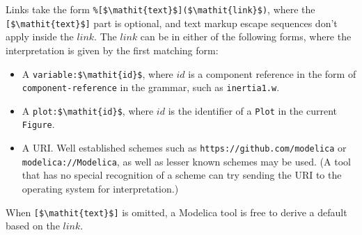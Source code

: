 Links take the form \lstinline!%[$\mathit{text}$]($\mathit{link}$)!, where the \lstinline![$\mathit{text}$]! part is optional, and text markup escape sequences don't apply inside the $\mathit{link}$.  The $\mathit{link}$ can be in either of the following forms, where the interpretation is given by the first matching form:
\begin{itemize}
\item
A \lstinline!variable:$\mathit{id}$!, where $\mathit{id}$ is a component reference in the form of \lstinline[language=grammar]!component-reference! in the grammar, such as \lstinline!inertia1.w!.
\item
A \lstinline!plot:$\mathit{id}$!, where $\mathit{id}$ is the identifier of a \lstinline!Plot! in the current \lstinline!Figure!.
\item
A URI.
Well established schemes such as \lstinline[language={[nocomment]modelica}]!https://github.com/modelica! or \lstinline[language={[nocomment]modelica}]!modelica://Modelica!, as well as lesser known schemes may be used.
(A tool that has no special recognition of a scheme can try sending the URI to the operating system for interpretation.)
\end{itemize}

When \lstinline![$\mathit{text}$]! is omitted, a Modelica tool is free to derive a default based on the $\mathit{link}$.

